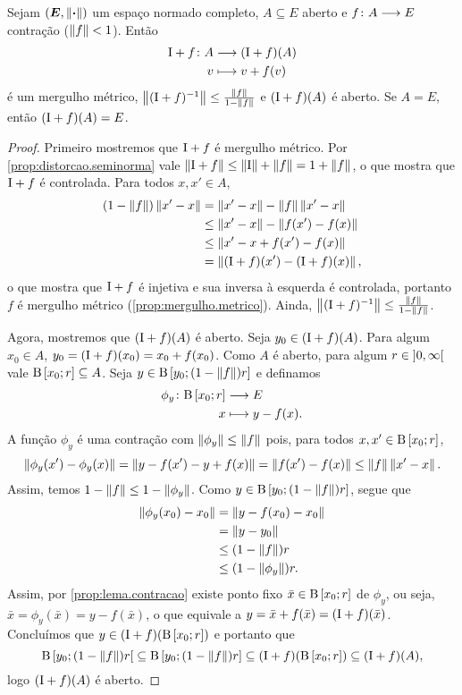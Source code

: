 \begin{proposition}
\label{prop:perturbacao.identidade}
Sejam $(\bm E,\left\Vert{\bm{\cdot}}\right\Vert)$ um espaço normado completo, $A \subseteq E$ aberto e ${f}\colon {A} \longrightarrow {E}$ contração ($\left\Vert{f}\right\Vert<1$). Então
	\begin{align*}
	{\mathrm{I}+f}\colon {A} &\longrightarrow {(\mathrm{I}+f)(A)} \\{v} &\longmapsto v+f(v)
	\end{align*}
é um mergulho métrico, $\left\Vert{(\mathrm{I}+f)^{-1}}\right\Vert \leq \frac{\left\Vert{f}\right\Vert}{1-\left\Vert{f}\right\Vert}$ e $(\mathrm{I}+f)(A)$ é aberto. Se $A=E$, então $(\mathrm{I} + f)(A)=E$.
\end{proposition}
\begin{proof}
Primeiro mostremos que $\mathrm{I}+f$ é mergulho métrico. Por \ref{prop:distorcao.seminorma} vale $\left\Vert{\mathrm{I}+f}\right\Vert \leq \left\Vert{\mathrm{I}}\right\Vert + \left\Vert{f}\right\Vert = 1+\left\Vert{f}\right\Vert$, o que mostra que $\mathrm{I} + f$ é controlada. Para todos $x,x' \in A$,
	\begin{align*}
	(1-\left\Vert{f}\right\Vert)\left\Vert{x'-x}\right\Vert &= \left\Vert{x'-x}\right\Vert-\left\Vert{f}\right\Vert\left\Vert{x'-x}\right\Vert \\
		&\leq \left\Vert{x'-x}\right\Vert - \left\Vert{f(x')-f(x)}\right\Vert \\
		&\leq \left\Vert{x'-x+f(x')-f(x)}\right\Vert \\
		&= \left\Vert{(\mathrm{I}+f)(x') - (\mathrm{I}+f)(x)}\right\Vert,
	\end{align*}
o que mostra que $\mathrm{I}+f$ é injetiva e sua inversa à esquerda é controlada, portanto $f$ é mergulho métrico (\ref{prop:mergulho.metrico}). Ainda, $\left\Vert{(\mathrm{I}+f)^{-1}}\right\Vert \leq \frac{\left\Vert{f}\right\Vert}{1-\left\Vert{f}\right\Vert}$.

Agora, mostremos que $(\mathrm{I}+f)(A)$ é aberto. Seja $y_0 \in (\mathrm{I}+f)(A)$. Para algum $x_0 \in A$, $y_0 = (\mathrm{I} + f)(x_0) = x_0 + f(x_0)$. Como $A$ é aberto, para algum $r \in \left]{0},{\infty}\right[$ vale $\mathrm{B}\left[{x_0};{r}\right] \subseteq A$.
Seja $y \in \mathrm{B}\left[{y_0};{(1-\left\Vert{f}\right\Vert)r}\right]$ e definamos
	\begin{align*}
	{\phi_y}\colon {\mathrm{B}\left[{x_0};{r}\right]} &\longrightarrow {E} \\{x} &\longmapsto y-f(x).
	\end{align*}
A função $\phi_y$ é uma contração com $\left\Vert{\phi_y}\right\Vert \leq \left\Vert{f}\right\Vert$ pois, para todos $x,x' \in \mathrm{B}\left[{x_0};{r}\right]$,
	\begin{equation*}
	\left\Vert{\phi_y(x')-\phi_y(x)}\right\Vert = \left\Vert{y-f(x')-y+f(x)}\right\Vert = \left\Vert{f(x')-f(x)}\right\Vert \leq \left\Vert{f}\right\Vert\left\Vert{x'-x}\right\Vert.
	\end{equation*}
Assim, temos $1-\left\Vert{f}\right\Vert \leq 1-\left\Vert{\phi_y}\right\Vert$. Como $y \in \mathrm{B}\left[{y_0};{(1-\left\Vert{f}\right\Vert)r}\right]$, segue que
	\begin{align*}
	\left\Vert{\phi_y(x_0) - x_0}\right\Vert &= \left\Vert{y-f(x_0)-x_0}\right\Vert \\
		&= \left\Vert{y-y_0}\right\Vert \\
		&\leq (1-\left\Vert{f}\right\Vert)r \\
		&\leq (1-\left\Vert{\phi_y}\right\Vert)r.
	\end{align*}
Assim, por \ref{prop:lema.contracao} existe ponto fixo $\bar x \in \mathrm{B}\left[{x_0};{r}\right]$ de $\phi_y$, ou seja, $\bar x = \phi_y(\bar x) = y-f(\bar x)$, o que equivale a $y = \bar x + f(\bar x) = (\mathrm{I}+f)(\bar x)$. Concluímos que $y \in (\mathrm{I} + f)(\mathrm{B}\left[{x_0};{r}\right])$ e portanto que
	\begin{equation*}
	\mathrm{B}\left[{y_0};{(1-\left\Vert{f}\right\Vert)r}\right[ \subseteq \mathrm{B}\left[{y_0};{(1-\left\Vert{f}\right\Vert)r}\right] \subseteq (\mathrm{I} + f)(\mathrm{B}\left[{x_0};{r}\right]) \subseteq (\mathrm{I} + f)(A),
	\end{equation*}
logo $(\mathrm{I} + f)(A)$ é aberto.


\end{proof}

